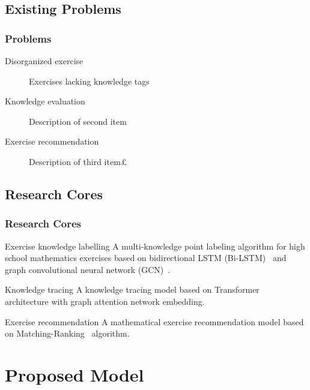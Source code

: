 \documentclass{beamer}
\begin{document}
\subsection{Existing Problems}
\begin{frame}
  \frametitle{Problems}
  \begin{description}
    \item[Disorganized exercise] Exercises lacking knowledge tags
    \item[Knowledge evaluation] Description of second item
    \item[Exercise recommendation] Description of third item£
  \end{description}
\end{frame}
\subsection{Research Cores}
\begin{frame}
  \frametitle{Research Cores}
  \begin{block}{Exercise knowledge labelling}
    A multi-knowledge point labeling algorithm for high school mathematics exercises based on bidirectional LSTM (Bi-LSTM)~\cite{chen2017improving} and graph convolutional neural network (GCN)~\cite{kipf2016semi}.
  \end{block}
  \begin{block}{Knowledge tracing}
    A knowledge tracing model based on Transformer~\cite{vaswani2017attention} architecture with graph attention network embedding.
  \end{block}
  \begin{block}{Exercise recommendation}
    A mathematical exercise recommendation model based on Matching-Ranking~\cite{segev2009context} algorithm.
  \end{block}
\end{frame}
\section{Proposed Model}
\end{document}
